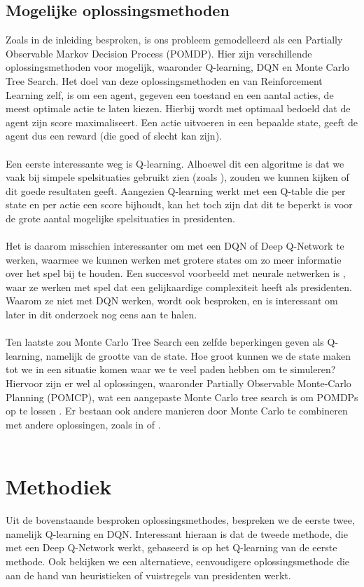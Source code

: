 \documentclass[11pt]{article}
\begin{document}
\subsection{Mogelijke oplossingsmethoden}
Zoals in de inleiding besproken, is ons probleem gemodelleerd als  een Partially Observable Markov Decision Process (POMDP). Hier zijn verschillende oplossingsmethoden voor mogelijk, waaronder Q-learning, DQN en Monte Carlo Tree Search. Het doel van deze oplossingsmethoden en van Reinforcement Learning zelf, is om een agent, gegeven een toestand en een aantal acties, de meest optimale actie te laten kiezen. Hierbij wordt met optimaal bedoeld dat de agent zijn score maximaliseert. Een actie uitvoeren in een bepaalde state, geeft de agent dus een reward (die goed of slecht kan zijn).\\\\ 
Een eerste interessante weg is Q-learning. Alhoewel dit een algoritme is dat we vaak bij simpele spelsituaties gebruikt zien (zoals \cite{simple-qlearning}), zouden we kunnen kijken of dit goede resultaten geeft. Aangezien Q-learning werkt met een Q-table die per state en per actie een score bijhoudt, kan het toch zijn dat dit te beperkt is voor de grote aantal mogelijke spelsituaties in presidenten. \\\\
Het is daarom misschien interessanter om met een DQN of Deep Q-Network te werken, waarmee we kunnen werken met grotere states om zo meer informatie over het spel bij te houden. Een succesvol voorbeeld met neurale netwerken is \cite{nn-paper}, waar ze werken met spel dat een gelijkaardige complexiteit heeft als presidenten. Waarom ze niet met DQN werken, wordt ook besproken, en is interessant om later in dit onderzoek nog eens aan te halen. \\\\
Ten laatste zou Monte Carlo Tree Search een zelfde beperkingen geven als Q-learning, namelijk de grootte van de state. Hoe groot kunnen we de state maken tot we in een situatie komen waar we te veel paden hebben om te simuleren? Hiervoor zijn er wel al oplossingen, waaronder Partially Observable Monte-Carlo Planning (POMCP), wat een aangepaste Monte Carlo tree search is om POMDPs op te lossen \cite{mct-1}. Er bestaan ook andere manieren door Monte Carlo te combineren met andere oplossingen, zoals in \cite{mct-2} of \cite{mct-3}.\\\\

\section{Methodiek}
Uit de bovenstaande besproken oplossingsmethodes, bespreken we de eerste twee, namelijk Q-learning en DQN. Interessant hieraan is dat de tweede methode, die met een Deep Q-Network werkt, gebaseerd is op het Q-learning van de eerste methode. Ook bekijken we een alternatieve, eenvoudigere oplossingsmethode die aan de hand van heuristieken of vuistregels van presidenten werkt.\\
\end{document}
